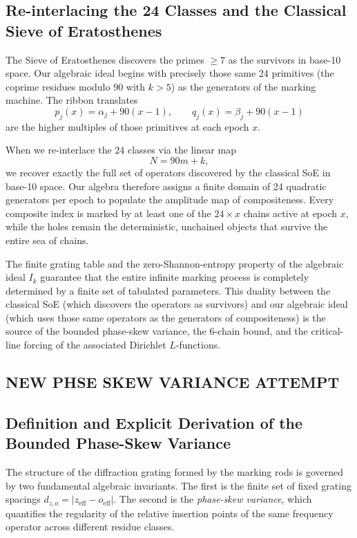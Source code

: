\documentclass[11pt,a4paper]{article}
\begin{document}
\subsection{Re-interlacing the 24 Classes and the Classical Sieve of Eratosthenes}

The Sieve of Eratosthenes discovers the primes \(\geq7\) as the survivors in base-10 space. Our algebraic ideal begins with precisely those same 24 primitives (the coprime residues modulo 90 with \(k>5\)) as the generators of the marking machine. The ribbon translates
\[
p_j(x)=\alpha_j+90(x-1),\qquad q_j(x)=\beta_j+90(x-1)
\]
are the higher multiples of those primitives at each epoch \(x\).

When we re-interlace the 24 classes via the linear map
\[
N=90m+k,
\]
we recover exactly the full set of operators discovered by the classical SoE in base-10 space. Our algebra therefore assigns a finite domain of 24 quadratic generators per epoch to populate the amplitude map of compositeness. Every composite index is marked by at least one of the \(24\times x\) chains active at epoch \(x\), while the holes remain the deterministic, unchained objects that survive the entire sea of chains.

The finite grating table and the zero-Shannon-entropy property of the algebraic ideal \(I_k\) guarantee that the entire infinite marking process is completely determined by a finite set of tabulated parameters. This duality between the classical SoE (which discovers the operators as survivors) and our algebraic ideal (which uses those same operators as the generators of compositeness) is the source of the bounded phase-skew variance, the 6-chain bound, and the critical-line forcing of the associated Dirichlet \(L\)-functions.


\subsection{NEW PHSE SKEW VARIANCE ATTEMPT}
\subsection{Definition and Explicit Derivation of the Bounded Phase-Skew Variance}

The structure of the diffraction grating formed by the marking rods is governed by two fundamental algebraic invariants. The first is the finite set of fixed grating spacings \(d_{z,o}=|z_{\mathrm{eff}}-o_{\mathrm{eff}}|\). The second is the \emph{phase-skew variance}, which quantifies the regularity of the relative insertion points of the same frequency operator across different residue classes.
\end{document}
